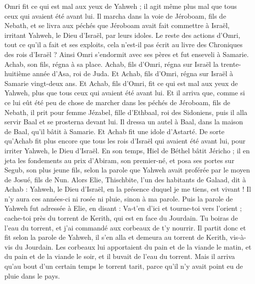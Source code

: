 \begin{multicols}{2}
Omri fit ce qui est mal aux yeux de Yahweh ; il agit même plus mal que tous ceux qui avaient été avant lui.
Il marcha dans la voie de Jéroboam, fils de Nebath, et se livra aux péchés que Jéroboam avait fait commettre à Israël, irritant Yahweh, le Dieu d'Israël, par leurs idoles.
Le reste des actions d’Omri, tout ce qu'il a fait et ses exploits, cela n’est-il pas écrit au livre des Chroniques des rois d'Israël ?
Ainsi Omri s'endormit avec ses pères et fut enseveli à Samarie. Achab, son fils, régna à sa place.
Achab, fils d’Omri, régna sur Israël la trente-huitième année d'Asa, roi de Juda. Et Achab, fils d’Omri, régna sur Israël à Samarie vingt-deux ans.
Et Achab, fils d’Omri, fit ce qui est mal aux yeux de Yahweh, plus que tous ceux qui avaient été avant lui.
Et il arriva que, comme si ce lui eût été peu de chose de marcher dans les péchés de Jéroboam, fils de Nebath, il prit pour femme Jézabel, fille d'Ethbaal, roi des Sidoniens, puis il alla servir Baal et se prosterna devant lui.
Il dressa un autel à Baal, dans la maison de Baal, qu'il bâtit à Samarie.
Et Achab fit une idole d’Astarté. De sorte qu'Achab fit plus encore que tous les rois d'Israël qui avaient été avant lui, pour irriter Yahweh, le Dieu d'Israël.
En son temps, Hiel de Béthel bâtit Jéricho ; il en jeta les fondements au prix d’Abiram, son premier-né, et posa ses portes sur Segub, son plus jeune fils, selon la parole que Yahweh avait proférée par le moyen de Josué, fils de Nun.
\VerseOne{}Alors Elie, Thischbite, l’un des habitants de Galaad, dit à Achab : Yahweh, le Dieu d'Israël, en la présence duquel je me tiens, est vivant ! Il n'y aura ces années-ci ni rosée ni pluie, sinon à ma parole.
Puis la parole de Yahweh fut adressée à Elie, en disant :
Va-t'en d'ici et tourne-toi vers l'orient ; cache-toi près du torrent de Kerith, qui est en face du Jourdain.
Tu boiras de l’eau du torrent, et j'ai commandé aux corbeaux de t'y nourrir.
Il partit donc et fit selon la parole de Yahweh, il s'en alla et demeura au torrent de Kerith, vis-à-vis du Jourdain.
Les corbeaux lui apportaient du pain et de la viande le matin, et du pain et de la viande le soir, et il buvait de l’eau du torrent.
Mais il arriva qu'au bout d’un certain temps le torrent tarit, parce qu'il n'y avait point eu de pluie dans le pays.

\end{multicols}
